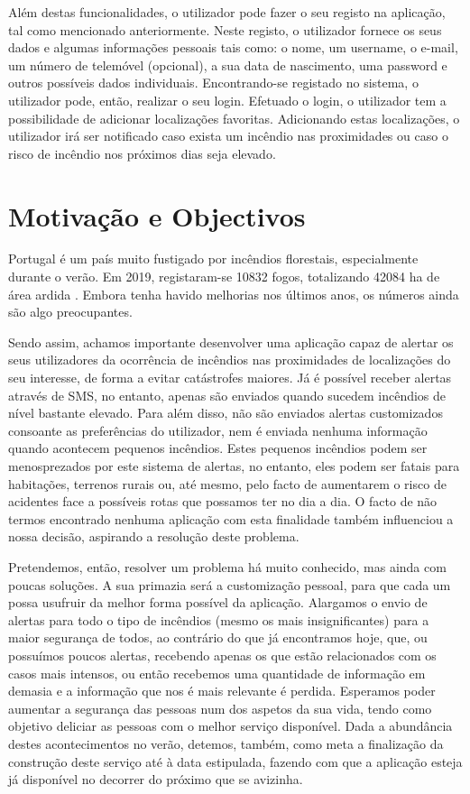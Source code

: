 \documentclass[a4paper,12pt]{scrreprt}
\newcommand{\tab}{
    \hspace{1cm}}
\begin{document}
        \tab Além destas funcionalidades, o utilizador pode fazer o seu registo na aplicação, tal como mencionado anteriormente. Neste registo, o utilizador fornece os seus dados e algumas informações pessoais tais como: o nome, um username, o e-mail, um número de telemóvel (opcional), a sua data de nascimento, uma password e outros possíveis dados individuais. Encontrando-se registado no sistema, o utilizador pode, então, realizar o seu login. Efetuado o login, o utilizador tem a possibilidade de adicionar localizações favoritas. Adicionando estas localizações, o utilizador irá ser notificado caso exista um incêndio nas proximidades ou caso o risco de incêndio nos próximos dias seja elevado.

    \section{Motivação e Objectivos}

        \tab Portugal é um país muito fustigado por incêndios florestais, especialmente durante o verão. Em 2019, registaram-se 10832 fogos, totalizando 42084 ha de área ardida \cite{relatorio_fogos_2019}. Embora tenha havido melhorias nos últimos anos, os números ainda são algo preocupantes.
        
        \tab Sendo assim, achamos importante desenvolver uma aplicação capaz de alertar os seus utilizadores da ocorrência de incêndios nas proximidades de localizações do seu interesse, de forma a evitar catástrofes maiores. Já é possível receber alertas através de SMS, no entanto, apenas são enviados quando sucedem incêndios de nível bastante elevado. Para além disso, não são enviados alertas customizados consoante as preferências do utilizador, nem é enviada nenhuma informação quando acontecem pequenos incêndios. Estes pequenos incêndios podem ser menosprezados por este sistema de alertas, no entanto, eles podem ser fatais para habitações, terrenos rurais ou, até mesmo, pelo facto de aumentarem o risco de acidentes face a possíveis rotas que possamos ter no dia a dia. O facto de não termos encontrado nenhuma aplicação com esta finalidade também influenciou a nossa decisão, aspirando a resolução deste problema.
        
        \tab Pretendemos, então, resolver um problema há muito conhecido, mas ainda com poucas soluções. A sua primazia será a customização pessoal, para que cada um possa usufruir da melhor forma possível da aplicação. Alargamos o envio de alertas para todo o tipo de incêndios (mesmo os mais insignificantes) para a maior segurança de todos, ao contrário do que já encontramos hoje, que, ou possuímos poucos alertas, recebendo apenas os que estão relacionados com os casos mais intensos, ou então recebemos uma quantidade de informação em demasia e a informação que nos é mais relevante é perdida. Esperamos poder aumentar a segurança das pessoas num dos aspetos da sua vida, tendo como objetivo deliciar as pessoas com o melhor serviço disponível. Dada a abundância destes acontecimentos no verão, detemos, também, como meta a finalização da construção deste serviço até à data estipulada, fazendo com que a aplicação esteja já disponível no decorrer do próximo que se avizinha.
\end{document}
